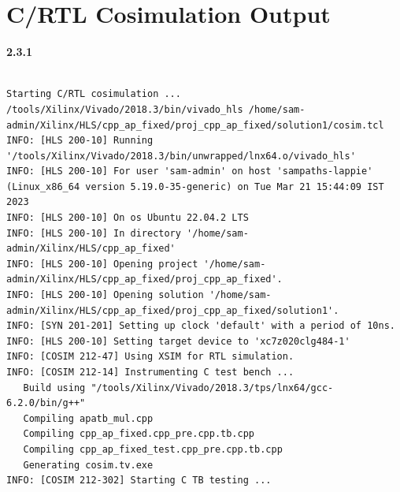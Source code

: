 \documentclass{article}
\begin{document}
\section{C/RTL Cosimulation Output}
\vspace{1cm}
\textbf{2.3.1}
\begin{lstlisting}

Starting C/RTL cosimulation ...
/tools/Xilinx/Vivado/2018.3/bin/vivado_hls /home/sam-admin/Xilinx/HLS/cpp_ap_fixed/proj_cpp_ap_fixed/solution1/cosim.tcl
INFO: [HLS 200-10] Running '/tools/Xilinx/Vivado/2018.3/bin/unwrapped/lnx64.o/vivado_hls'
INFO: [HLS 200-10] For user 'sam-admin' on host 'sampaths-lappie' (Linux_x86_64 version 5.19.0-35-generic) on Tue Mar 21 15:44:09 IST 2023
INFO: [HLS 200-10] On os Ubuntu 22.04.2 LTS
INFO: [HLS 200-10] In directory '/home/sam-admin/Xilinx/HLS/cpp_ap_fixed'
INFO: [HLS 200-10] Opening project '/home/sam-admin/Xilinx/HLS/cpp_ap_fixed/proj_cpp_ap_fixed'.
INFO: [HLS 200-10] Opening solution '/home/sam-admin/Xilinx/HLS/cpp_ap_fixed/proj_cpp_ap_fixed/solution1'.
INFO: [SYN 201-201] Setting up clock 'default' with a period of 10ns.
INFO: [HLS 200-10] Setting target device to 'xc7z020clg484-1'
INFO: [COSIM 212-47] Using XSIM for RTL simulation.
INFO: [COSIM 212-14] Instrumenting C test bench ...
   Build using "/tools/Xilinx/Vivado/2018.3/tps/lnx64/gcc-6.2.0/bin/g++"
   Compiling apatb_mul.cpp
   Compiling cpp_ap_fixed.cpp_pre.cpp.tb.cpp
   Compiling cpp_ap_fixed_test.cpp_pre.cpp.tb.cpp
   Generating cosim.tv.exe
INFO: [COSIM 212-302] Starting C TB testing ... 



\end{lstlisting}
\end{document}
